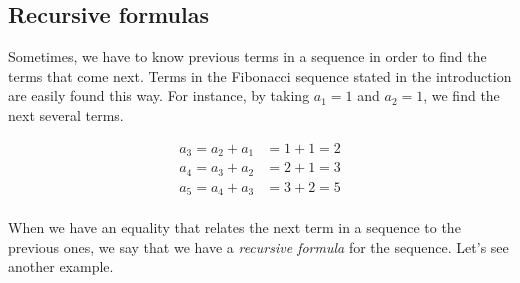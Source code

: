 \documentclass{ximera}
\begin{document}

\subsection{Recursive formulas}

Sometimes, we have to know previous terms in a sequence in order to find the terms that come next.  Terms in the Fibonacci sequence stated in the introduction are easily found this way.  For instance, by taking $a_1=1$ and $a_2=1$, we find the next several terms.

\begin{align*}
a_3 = a_2+a_1 & = 1+1=2 \\
a_4 = a_3+a_2 &= 2+1 = 3 \\
a_5 = a_4+a_3 &= 3+2 = 5 \\
\end{align*}

When we have an equality that relates the next term in a sequence to the previous ones, we say that we have a \emph{recursive formula} for the sequence.  Let's see another example.
\end{document}
